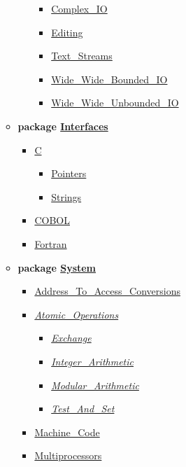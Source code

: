 \begin{multicols*}{\columnnr}
\begin{scriptsize}
\begin{itemize}[leftmargin=0mm]
\begin{itemize}[leftmargin=5mm]
\begin{itemize}[leftmargin=5mm]
	  \begin{itemize}[leftmargin=5mm]
	  \item[] \href{\adarmlink{RM-G-1-5.html}}{Complex\_IO}
	  \item[] \href{\adarmlink{RM-F-3-5.html}}{Editing}
	  \item[] \href{\adarmlink{RM-A-12-4.html}}{Text\_Streams}
	  \item[] \href{\adarmlink{RM-A-11.html}}{Wide\_Wide\_Bounded\_IO}
	  \item[] \href{\adarmlink{RM-A-11.html}}{Wide\_Wide\_Unbounded\_IO}
	  \end{itemize}
	\end{itemize}
  \item[] \textbf{package \href{\adarmlink{RM-B-2.html}}{Interfaces}}
	\begin{itemize}[leftmargin=5mm]
	\item[] \href{\adarmlink{RM-B-3.html}}{C}
	  \begin{itemize}[leftmargin=5mm]
	  \item[] \href{\adarmlink{RM-B-3-2.html}}{Pointers}
	  \item[] \href{\adarmlink{RM-B-3-1.html}}{Strings}
	  \end{itemize}
	\item[] \href{\adarmlink{RM-B-4.html}}{COBOL}
	\item[] \href{\adarmlink{RM-B-5.html}}{Fortran}
	\end{itemize}
  \item[] \textbf{package \href{\adarmlink{RM-13-7.html}}{System}}
	\begin{itemize}[leftmargin=5mm]
	\item[] \href{\adarmlink{RM-13-7-2.html}}{Address\_To\_Access\_Conversions}
	\item[] \href{\adarmlink{RM-C-6-1.html}}{\textit{Atomic\_Operations}}
	  \begin{itemize}[leftmargin=5mm]
	  \item[] \href{\adarmlink{RM-C-6-2.html}}{\textit{Exchange}}
	  \item[] \href{\adarmlink{RM-C-6-4.html}}{\textit{Integer\_Arithmetic}}
	  \item[] \href{\adarmlink{RM-C-6-5.html}}{\textit{Modular\_Arithmetic}}
	  \item[] \href{\adarmlink{RM-C-6-3.html}}{\textit{Test\_And\_Set}}
	  \end{itemize}
	\item[] \href{\adarmlink{RM-13-8.html}}{Machine\_Code}
	\item[] \href{\adarmlink{RM-D-16.html}}{Multiprocessors}

\end{itemize}
\end{itemize}
\end{itemize}
\end{scriptsize}
\end{multicols*}
